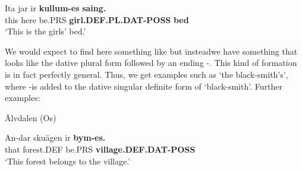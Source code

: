 
 \ea\label{}
\gll Ita  jar  ir  \textbf{kullum-es}\textbf{  saing.}\\


this  here  be.PRS  \textbf{girl.DEF.PL.DAT-POSS} \textbf{bed}\\

\glt ‘This is the girls’ bed.’

\z

We would expect to find here something like but instead\textstyleLinguisticExample{ }we have something that looks like the dative plural form  followed by an ending \nobreakdash-. This kind of formation is in fact perfectly general. Thus, we get examples such as  ‘the black-smith’s’, where \nobreakdash-is added to the dative singular definite form  of  ‘black-smith’. Further examples:


\item 

Älvdalen (Os)



\item 


 \ea\label{}
\gll An-dar  skuägen  ir  \textbf{bym-es.}\\


that  forest.DEF  be.PRS  \textbf{village.DEF.DAT-POSS}\\

\glt ‘This forest belongs to the village.’

\z

\item 

